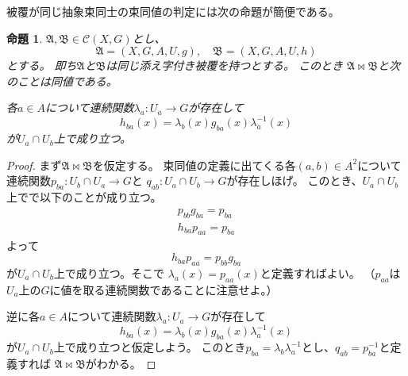\documentclass[leqno]{jsarticle}
\newtheorem{prop}[thm]{命題}
\begin{document}
被覆が同じ抽象束同士の束同値の判定には次の命題が簡便である。
\begin{prop}
$\mathfrak{A}, \mathfrak{B}\in \mathscr{C}(X,G)$とし、
\[
\mathfrak{A}=(X, G, A, U, g), \quad \mathfrak{B}=(X, G, A, U, h)
\]
とする。
即ち$\mathfrak{A}$と$\mathfrak{B}$は同じ添え字付き被覆を持つとする。
このとき
$\mathfrak{A}\bowtie \mathfrak{B}$と次のことは同値である。
\par
各$a\in A$について連続関数$\lambda_a:U_a\to G$が存在して
\[
h_{ba}(x)=\lambda_b(x) g_{ba}(x) \lambda_{a}^{-1}(x)
\]
が$U_a\cap U_b$上で成り立つ。
\end{prop}
\begin{proof}
まず$\mathfrak{A}\bowtie \mathfrak{B}$を仮定する。
束同値の定義に出てくる各$(a,b)\in A^2$について連続関数$p_{ba}:U_b\cap U_a\to G$と
$q_{ab}:U_a\cap U_b\to G$が存在しほげ。
このとき、$U_a\cap U_b$上でで以下のことが成り立つ。
\begin{align*}
p_{bb}g_{ba}=p_{ba}\\
h_{ba}p_{aa}=p_{ba}
\end{align*}
よって
\[
h_{ba}p_{aa}=p_{bb}g_{ba}
\]
が$U_a\cap U_b$上で成り立つ。そこで
$\lambda_a(x)=p_{aa}(x)$と定義すればよい。
（$p_{aa}$は$U_a$上の$G$に値を取る連続関数であることに注意せよ。）
\par
逆に各$a\in A$について連続関数$\lambda_a:U_a\to G$が存在して
\[
h_{ba}(x)=\lambda_b(x) g_{ba}(x) \lambda_{a}^{-1}(x)
\]
が$U_a\cap U_b$上で成り立つと仮定しよう。
このとき$p_{ba}=\lambda_b\lambda^{-1}_a$とし、$q_{ab}=p^{-1}_{ba}$と定義すれば
$\mathfrak{A}\bowtie \mathfrak{B}$がわかる。
\end{proof}
\end{document}
